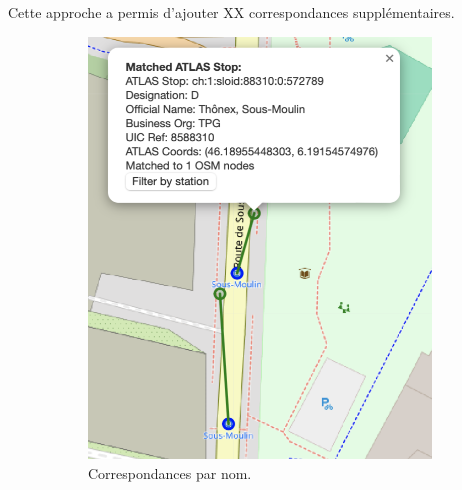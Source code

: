 Cette approche a permis d'ajouter XX correspondances supplémentaires.
\begin{figure}[h]
    \centering
    \begin{subfigure}[b]{0.4\textwidth}
        \centering
        \includegraphics[width=\textwidth]{../figures/correspondances/name_app.png}
        \caption[Correspondances par nom]{Correspondances par nom.}
        \label{fig:name_app}
    \end{subfigure}
    \hspace{-0.2cm}  %
    \begin{subfigure}[b]{0.45\textwidth}
        \centering

\end{subfigure}
\end{figure}
